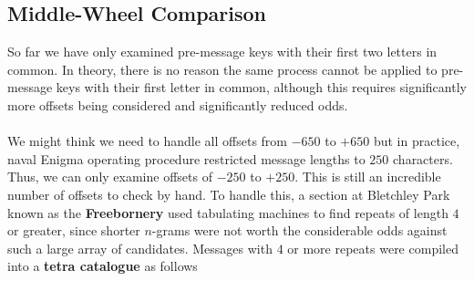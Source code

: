   \subsection{Middle-Wheel Comparison}
  So far we have only examined pre-message keys with their first two
  letters in common. In theory, there is no reason the same process
  cannot be applied to pre-message keys with their first letter in
  common, although this requires significantly more offsets being
  considered and significantly reduced odds.
  \\\\We might think we need to handle all offsets from $-650$ to
  $+650$ but in practice, naval Enigma operating procedure restricted
  message lengths to $250$ characters. Thus, we can only examine
  offsets of $-250$ to $+250$. This is still an incredible number of
  offsets to check by hand. To handle this, a section at Bletchley
  Park known as the {\bf{Freebornery}} used tabulating machines to
  find repeats of length $4$ or greater, since shorter $n$-grams were
  not worth the considerable odds against such a large array of
  candidates. Messages with $4$ or more repeats were compiled into a
  {\bf{tetra catalogue}} as follows

